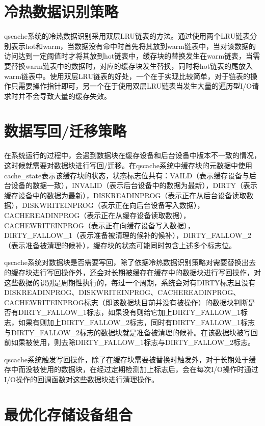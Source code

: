 \section{冷热数据识别策略}
\label{sec:data_hot_identification}

qscache系统的冷热数据识别采用双层LRU链表的方法。通过使用两个LRU链表分别表示hot和warm，当数据没有命中时首先将其放到warm链表中，当对该数据的访问达到一定阈值时才将其放到hot链表中，缓存块的替换发生在warm链表，当需要替换warm链表中的数据时，对应的缓存块发生替换，同时将hot链表的尾放入warm链表中。使用双层LRU链表的好处，一个在于实现比较简单，对于链表的操作只需要操作指针即可，另一个在于使用双层LRU链表当发生大量的遍历型I/O请求时并不会导致大量的缓存失效。

\section{数据写回/迁移策略}

在系统运行的过程中，会遇到数据块在缓存设备和后台设备中版本不一致的情况，这时候就需要对数据块进行写回/迁移。在qscache系统中缓存块的元数据中使用cache\_state表示该缓存块的状态，状态标志位共有：VAILD（表示缓存设备与后台设备的数据一致），INVALID（表示后台设备中的数据为最新），DIRTY（表示缓存设备中的数据为最新），DISKREADINPROG（表示正在从后台设备读取数据），DISKWRITEINPROG（表示正在向后台设备写入数据），CACHEREADINPROG（表示正在从缓存设备读取数据），CACHEWRITEINPROG（表示正在向缓存设备写入数据），DIRTY\_FALLOW\_1（表示准备被清理的候补的候补），DIRTY\_FALLOW\_2（表示准备被清理的候补），缓存块的状态可能同时包含上述多个标志位。

qscache系统对数据块是否需要写回，除了依据冷热数据识别策略对需要替换出去的缓存块进行写回操作外，还会对长期被缓存在缓存中的数据块进行写回操作，对这些数据的识别是周期性执行的，每过一个周期，系统会对有DIRTY标志且没有DISKREADINPROG、DISKWRITEINPROG、CACHEREADINPROG、CACHEWRITEINPROG标志（即该数据块目前并没有被操作）的数据块判断是否有DIRTY\_FALLOW\_1标志，如果没有则给它加上DIRTY\_FALLOW\_1标志，如果有则加上DIRTY\_FALLOW\_2标志，同时有DIRTY\_FALLOW\_1标志与DIRTY\_FALLOW\_2标志的数据块就是准备被清理的候补。在该数据块被写回前如果被使用，则去除DIRTY\_FALLOW\_1标志与DIRTY\_FALLOW\_2标志。

qscache系统触发写回操作，除了在缓存块需要被替换时触发外，对于长期处于缓存中而没被使用的数据块，在经过定期检测加上标志后，会在每次I/O操作时通过I/O操作的回调函数对这些数据块进行清理操作。


\section{最优化存储设备组合}

